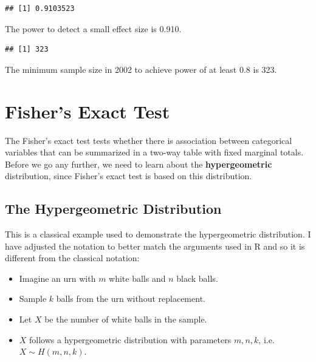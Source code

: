 \documentclass[
]{book}
\newenvironment{Shaded}{\begin{snugshade}}{\end{snugshade}}
\newcommand{\AttributeTok}[1]{\textcolor[rgb]{0.13,0.29,0.53}{#1}}
\newcommand{\DecValTok}[1]{\textcolor[rgb]{0.00,0.00,0.81}{#1}}
\newcommand{\DocumentationTok}[1]{\textcolor[rgb]{0.56,0.35,0.01}{\textbf{\textit{#1}}}}
\newcommand{\FloatTok}[1]{\textcolor[rgb]{0.00,0.00,0.81}{#1}}
\newcommand{\FunctionTok}[1]{\textcolor[rgb]{0.13,0.29,0.53}{\textbf{#1}}}
\newcommand{\NormalTok}[1]{#1}
\newcommand{\SpecialCharTok}[1]{\textcolor[rgb]{0.81,0.36,0.00}{\textbf{#1}}}
\newcommand{\StringTok}[1]{\textcolor[rgb]{0.31,0.60,0.02}{#1}}
\providecommand{\tightlist}{%
  \setlength{\itemsep}{0pt}\setlength{\parskip}{0pt}}
\theoremstyle{definition}
\theoremstyle{definition}
\theoremstyle{definition}
\theoremstyle{definition}
\theoremstyle{remark}
\begin{document}
\begin{verbatim}
## [1] 0.9103523
\end{verbatim}

The power to detect a small effect size is 0.910.

\begin{Shaded}
\end{Shaded}

\begin{verbatim}
## [1] 323
\end{verbatim}

The minimum sample size in 2002 to achieve power of at least 0.8 is 323.

\hypertarget{exact}{%
\section{Fisher's Exact Test}\label{exact}}

The Fisher's exact test tests whether there is association between categorical variables that can be summarized in a two-way table with fixed marginal totals. Before we go any further, we need to learn about the \textbf{hypergeometric} distribution, since Fisher's exact test is based on this distribution.

\hypertarget{the-hypergeometric-distribution}{%
\subsection{The Hypergeometric Distribution}\label{the-hypergeometric-distribution}}

This is a classical example used to demonstrate the hypergeometric distribution. I have adjusted the notation to better match the arguments used in R and so it is different from the classical notation:

\begin{itemize}
\tightlist
\item
  Imagine an urn with \(m\) white balls and \(n\) black balls.
\item
  Sample \(k\) balls from the urn without replacement.
\item
  Let \(X\) be the number of white balls in the sample.
\item
  \(X\) follows a hypergeometric distribution with parameters \(m, n, k\), i.e.~\(X \sim H(m, n, k)\).
\end{itemize}
\end{document}
